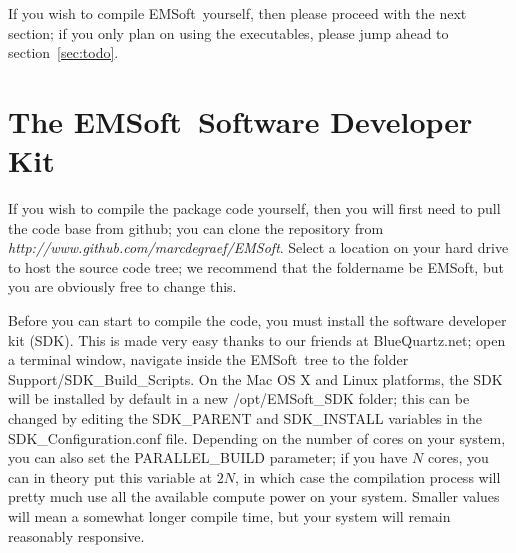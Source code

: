 \documentclass[DIV=calc, paper=letter, fontsize=11pt]{scrartcl}	 %
\newcommand{\ctp}{\textsf{EMSoft}}
\newcommand{\ctpb}{\textbf{\textsf{EMSoft}}}
\begin{document}
If you wish to compile \ctp\ yourself, then please proceed with the next section; if you only plan on using the 
executables, please jump ahead to section~\ref{sec:todo}.


\section{The \ctpb\ Software Developer Kit\label{sec:SDK}}
If you wish to compile the package code yourself, then you will first need to pull the code base from github; you can 
clone the repository from \textit{http://www.github.com/marcdegraef/EMSoft}.  Select a location on your hard drive to 
host the source code tree; we recommend that the foldername be \ctp, but you are obviously free to change this.

Before you can start to compile the code, you must install the software developer kit (SDK).  This is made very easy thanks to our
friends at BlueQuartz.net; open a terminal window, navigate inside the \ctp\ tree to the folder \textsf{Support/SDK\_Build\_Scripts}.
On the Mac OS X and Linux platforms, the SDK will be installed by default in a new \textsf{/opt/EMSoft\_SDK}
folder; this can be changed by editing the \textsf{SDK\_PARENT}  and \textsf{SDK\_INSTALL} variables in the \textsf{SDK\_Configuration.conf}  file.
Depending on the number of cores on your system, you can also set the \textsf{PARALLEL\_BUILD} parameter; if you have
$N$ cores, you can in theory put this variable at $2N$, in which case the compilation process will pretty much use all the 
available compute power on your system. Smaller values will mean a somewhat longer compile time, but your system will
remain reasonably responsive.
\end{document}
